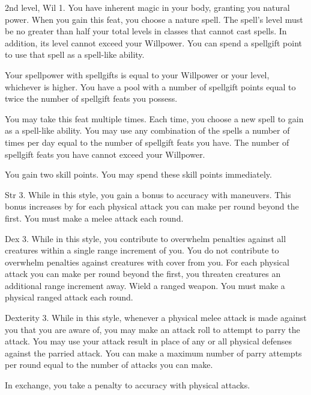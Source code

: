 \featpres 2nd level, Wil 1.
\featben You have inherent magic in your body, granting you natural power.
When you gain this feat, you choose a nature spell.
The spell's level must be no greater than half your total levels in classes that cannot cast spells.
In addition, its level cannot exceed your Willpower.
You can spend a spellgift point to use that spell as a spell-like ability.

Your spellpower with spellgifts is equal to your Willpower or your level, whichever is higher.
You have a pool with a number of spellgift points equal to twice the number of spellgift feats you possess.

You may take this feat multiple times.
Each time, you choose a new spell to gain as a spell-like ability.
You may use any combination of the spells a number of times per day equal to the number of spellgift feats you have.
The number of spellgift feats you have cannot exceed your Willpower.

\featben You gain two skill points.
You may spend these skill points immediately.

\featpre Str 3.
\featben While in this style, you gain a  bonus to accuracy with maneuvers.
This bonus increases by  for each physical attack you can make per round beyond the first.
\stylereq You must make a melee attack each round.

\featpre Dex 3.
\featben While in this style, you contribute to overwhelm penalties against all creatures within a single range increment of you.
You do not contribute to overwhelm penalties against creatures with cover from you.
For each physical attack you can make per round beyond the first, you threaten creatures an additional range increment away.
\stylereq Wield a ranged weapon.
You must make a physical ranged attack each round.

\featpre Dexterity 3.
\featben While in this style, whenever a physical melee attack is made against you that you are aware of, you may make an attack roll to attempt to parry the attack.
You may use your attack result in place of any or all physical defenses against the parried attack.
You can make a maximum number of parry attempts per round equal to the number of attacks you can make.

In exchange, you take a  penalty to accuracy with physical attacks.

